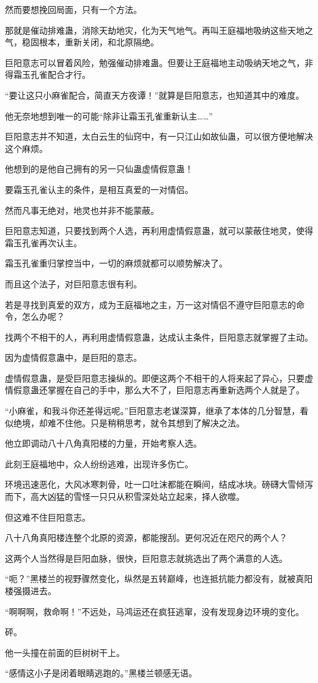 \begin{this_body}
然而要想挽回局面，只有一个方法。

那就是催动排难蛊，消除天劫地灾，化为天气地气。再叫王庭福地吸纳这些天地之气，稳固根本，重新关闭，和北原隔绝。

巨阳意志可以冒着风险，勉强催动排难蛊。但要让王庭福地主动吸纳天地之气，非得霜玉孔雀配合才行。

“要让这只小麻雀配合，简直天方夜谭！”就算是巨阳意志，也知道其中的难度。

他无奈地想到唯一的可能“除非让霜玉孔雀重新认主……”

巨阳意志并不知道，太白云生的仙窍中，有一只江山如故仙蛊，可以很方便地解决这个麻烦。

他想到的是他自己拥有的另一只仙蛊虚情假意蛊！

要霜玉孔雀认主的条件，是相互真爱的一对情侣。

然而凡事无绝对，地灵也并非不能蒙蔽。

巨阳意志知道，只要找到两个人选，再利用虚情假意蛊，就可以蒙蔽住地灵，使得霜玉孔雀再次认主。

霜玉孔雀重归掌控当中，一切的麻烦就都可以顺势解决了。

而且这个法子，对巨阳意志很有利。

若是寻找到真爱的双方，成为王庭福地之主，万一这对情侣不遵守巨阳意志的命令，怎么办呢？

找两个不相干的人，再利用虚情假意蛊，达成认主条件，巨阳意志就掌握了主动。

因为虚情假意蛊中，是巨阳的意志。

虚情假意蛊，是受巨阳意志操纵的。即便这两个不相干的人将来起了异心，只要虚情假意蛊还掌握在自己的手中，那么大不了，巨阳意志再重新选两个人就是了。

“小麻雀，和我斗你还差得远呢。”巨阳意志老谋深算，继承了本体的几分智慧，看似绝境，却难不住他。只是稍稍思考，就令其想到了解决之法。

他立即调动八十八角真阳楼的力量，开始考察人选。

此刻王庭福地中，众人纷纷逃难，出现许多伤亡。

环境迅速恶化，大风冰寒刺骨，吐一口吐沫都能在瞬间，结成冰块。磅礴大雪倾泻而下，高大凶猛的雪怪一只只从积雪深处站立起来，择人欲噬。

但这难不住巨阳意志。

八十八角真阳楼连整个北原的资源，都能搜刮。更何况近在咫尺的两个人？

这两个人当然得是巨阳血脉，很快，巨阳意志就挑选出了两个满意的人选。

“呃？”黑楼兰的视野骤然变化，纵然是五转巅峰，也连抵抗能力都没有，就被真阳楼强摄进去。

“啊啊啊，救命啊！”不远处，马鸿运还在疯狂逃窜，没有发现身边环境的变化。

砰。

他一头撞在前面的巨树树干上。

“感情这小子是闭着眼睛逃跑的。”黑楼兰顿感无语。

\end{this_body}

